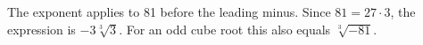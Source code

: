 The exponent applies to 81 before the leading minus. Since $81=27\cdot3$, the expression is $\boxed{-3\sqrt[3]3}$. For an odd cube root this also equals $\sqrt[3]{-81}$.
